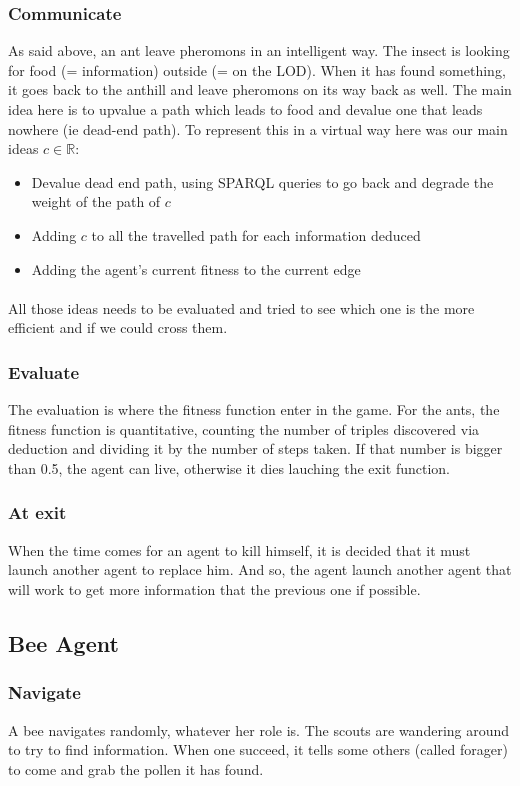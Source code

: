 \documentclass{article}
\newenvironment{itemh}[0]{\begin{itemize}[label=$\heartsuit$, font=\color{mygray} \small]}{\end{itemize}}
\begin{document}
		\subsubsection{Communicate}
			As said above, an ant leave pheromons in an intelligent way.
			The insect is looking for food (= information) outside (= on the LOD).
			When it has found something, it goes back to the anthill and leave pheromons on its way back as well.
			The main idea here is to upvalue a path which leads to food and devalue one that leads nowhere (ie dead-end path).
			To represent this in a virtual way here was our main ideas $c \in \mathbb{R}$:
			\begin{itemh}
				\item Devalue dead end path, using SPARQL queries to go back and degrade the weight of the path of $c$
				\item Adding $c$ to all the travelled path for each information deduced
				\item Adding the agent's current fitness to the current edge
			\end{itemh}
			\paragraph{}
				All those ideas needs to be evaluated and tried to see which one is the more efficient and if we could cross them.
		\subsubsection{Evaluate}
			The evaluation is where the fitness function enter in the game.
			For the ants, the fitness function is quantitative,
			counting the number of triples discovered via deduction and dividing it by the number of steps taken.
			If that number is bigger than 0.5, the agent can live, otherwise it dies lauching the exit function.
		\subsubsection{At exit}
			When the time comes for an agent to kill himself, it is decided that it must launch another agent to replace him.
			And so, the agent launch another agent that will work to get more information that the previous one if possible.
	\subsection{Bee Agent}
		\subsubsection{Navigate}
			A bee navigates randomly, whatever her role is.
			The scouts are wandering around to try to find information.
			When one succeed, it tells some others (called forager) to come and grab the pollen it has found.
\end{document}
